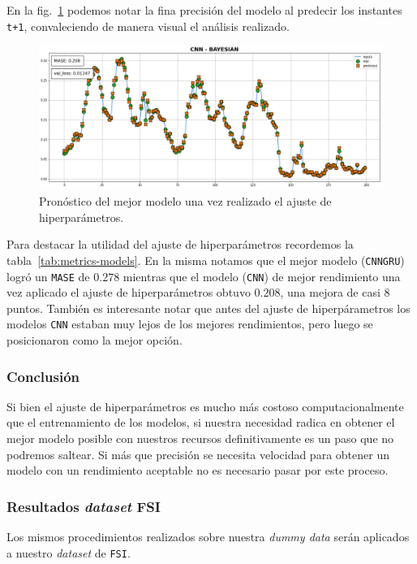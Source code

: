 \documentclass[a4paper,12pt]{article}
\begin{document}
En la fig.~\ref{fig:best_model_hp} podemos notar la fina precisión del modelo al predecir los instantes \texttt{t+1}, convaleciendo de manera visual el análisis realizado.

\begin{figure}[H]
	\begin{center}
	\includegraphics[width=1\textwidth]{cnn_bo_best.png}
  	\caption{Pronóstico del mejor modelo una vez realizado el ajuste de hiperparámetros.}
  	\label{fig:best_model_hp}
  	\end{center}
\end{figure}

Para destacar la utilidad del ajuste de hiperparámetros recordemos la tabla~\ref{tab:metrics-models}. En la misma notamos que el mejor modelo (\texttt{CNNGRU}) logró un \texttt{MASE} de $0.278$ mientras que el modelo (\texttt{CNN}) de mejor rendimiento una vez aplicado el ajuste de hiperparámetros obtuvo $0.208$, una mejora de casi 8 puntos. También es interesante notar que antes del ajuste de hiperpárametros los modelos \texttt{CNN} estaban muy lejos de los mejores rendimientos, pero luego se posicionaron como la mejor opción.

\subsubsection{Conclusión}
Si bien el ajuste de hiperparámetros es mucho más costoso computacionalmente que el entrenamiento de los modelos, si nuestra necesidad radica en obtener el mejor modelo posible con nuestros recursos definitivamente es un paso que no podremos saltear. Si más que precisión se necesita velocidad para obtener un modelo con un rendimiento aceptable no es necesario pasar por este proceso.

\subsubsection{Resultados \textit{dataset} FSI}
Los mismos procedimientos realizados sobre nuestra \textit{dummy data} serán aplicados a nuestro \textit{dataset} de \texttt{FSI}.
\end{document}
